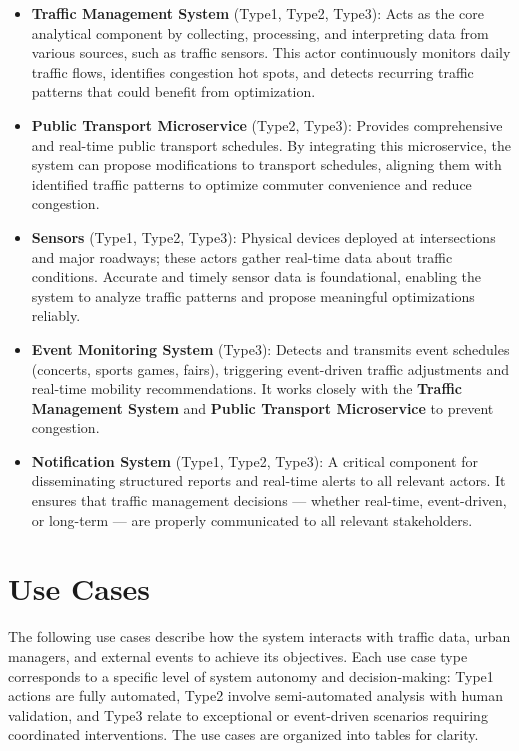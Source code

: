 \documentclass[a4paper,12pt]{article}
\begin{document}
\begin{itemize}
    \item \textbf{Traffic Management System} (Type1, Type2, Type3): Acts as the core analytical component by collecting, processing, and interpreting data from various sources, such as traffic sensors. This actor continuously monitors daily traffic flows, identifies congestion hot spots, and detects recurring traffic patterns that could benefit from optimization.
    \item \textbf{Public Transport Microservice} (Type2, Type3): Provides comprehensive and real-time public transport schedules. By integrating this microservice, the system can propose modifications to transport schedules, aligning them with identified traffic patterns to optimize commuter convenience and reduce congestion.
    \item \textbf{Sensors} (Type1, Type2, Type3): Physical devices deployed at intersections and major roadways; these actors gather real-time data about traffic conditions. Accurate and timely sensor data is foundational, enabling the system to analyze traffic patterns and propose meaningful optimizations reliably.
    \item \textbf{Event Monitoring System} (Type3): Detects and transmits event schedules (concerts, sports games, fairs), triggering event-driven traffic adjustments and real-time mobility recommendations. It works closely with the \textbf{Traffic Management System} and \textbf{Public Transport Microservice} to prevent congestion.
    \item \textbf{Notification System} (Type1, Type2, Type3): A critical component for disseminating structured reports and real-time alerts to all relevant actors. It ensures that traffic management decisions — whether real-time, event-driven, or long-term — are properly communicated to all relevant stakeholders.
\end{itemize}

\newpage

\section{Use Cases}
The following use cases describe how the system interacts with traffic data, urban managers, and external events to achieve its objectives. Each use case type corresponds to a specific level of system autonomy and decision-making: Type1 actions are fully automated, Type2 involve semi-automated analysis with human validation, and Type3 relate to exceptional or event-driven scenarios requiring coordinated interventions. The use cases are organized into tables for clarity.
\end{document}
